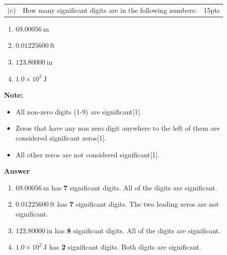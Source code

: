 \documentclass{article}
\newcommand{\problemstatement}[3]{
\noindent
\begin{tabular}{ m{0.5cm} m{42em} m{0.5cm} }
	({#1}) & {#2} & {#3}pts
\end{tabular}
}
\begin{document}
\newpage
\problemstatement{c}{How many significant digits are in the following numbers:}{15}
\begin{enumerate}
	\item \(69.00056\:\text{m}\)
	\item \(0.01225600\:\text{ft}\)
	\item \(123.80000\:\text{in}\)
	\item \(1.0 \times 10^2\:\text{J}\)
\end{enumerate}
\begin{addmargin}[1.5cm]{0em}
	\noindent
	\textbf{Note:}
	\begin{itemize}
		\item All non-zero digits (1-9) are significant[1].
		\item Zeros that have any non zero digit anywhere to the left of them are considered significant zeros[1].
		\item All other zeros are not considered significant[1].
	\end{itemize}
	\noindent
	\textbf{Answer}
	\begin{enumerate}
		\item \(69.00056\:\text{m}\) has \textbf{7} significant digits. All of the digits are significant.
		\item \(0.01225600\:\text{ft}\) has \textbf{7} significant digits. The two leading zeros are not significant.
		\item \(123.80000\:\text{in}\) has \textbf{8} significant digits. All of the digits are significant.
		\item \(1.0 \times 10^2\:\text{J}\) has \textbf{2} significant digits. Both digits are significant.
	\end{enumerate}
\end{addmargin}
\end{document}
